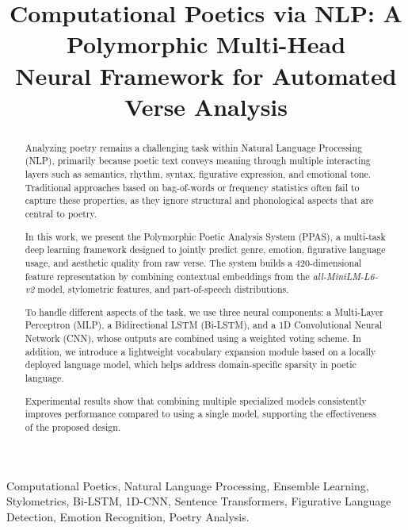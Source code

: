 \documentclass[conference]{IEEEtran}
\begin{document}
\title{Computational Poetics via NLP: A Polymorphic Multi-Head\\
Neural Framework for Automated Verse Analysis}

\author{
}

\maketitle

\begin{abstract}
Analyzing poetry remains a challenging task within Natural Language
Processing (NLP), primarily because poetic text conveys meaning through
multiple interacting layers such as semantics, rhythm, syntax, figurative
expression, and emotional tone. Traditional approaches based on
bag-of-words or frequency statistics often fail to capture these
properties, as they ignore structural and phonological aspects that are
central to poetry.

In this work, we present the Polymorphic Poetic Analysis System (PPAS),
a multi-task deep learning framework designed to jointly predict genre,
emotion, figurative language usage, and aesthetic quality from raw verse.
The system builds a 420-dimensional feature representation by combining
contextual embeddings from the \textit{all-MiniLM-L6-v2} model,
stylometric features, and part-of-speech distributions.

To handle different aspects of the task, we use three neural components:
a Multi-Layer Perceptron (MLP), a Bidirectional LSTM (Bi-LSTM), and a
1D Convolutional Neural Network (CNN), whose outputs are combined using
a weighted voting scheme. In addition, we introduce a lightweight
vocabulary expansion module based on a locally deployed language model,
which helps address domain-specific sparsity in poetic language.

Experimental results show that combining multiple specialized models
consistently improves performance compared to using a single model,
supporting the effectiveness of the proposed design.
\end{abstract}

\begin{IEEEkeywords}
Computational Poetics, Natural Language Processing, Ensemble Learning,
Stylometrics, Bi-LSTM, 1D-CNN, Sentence Transformers, Figurative
Language Detection, Emotion Recognition, Poetry Analysis.
\end{IEEEkeywords}
\end{document}
